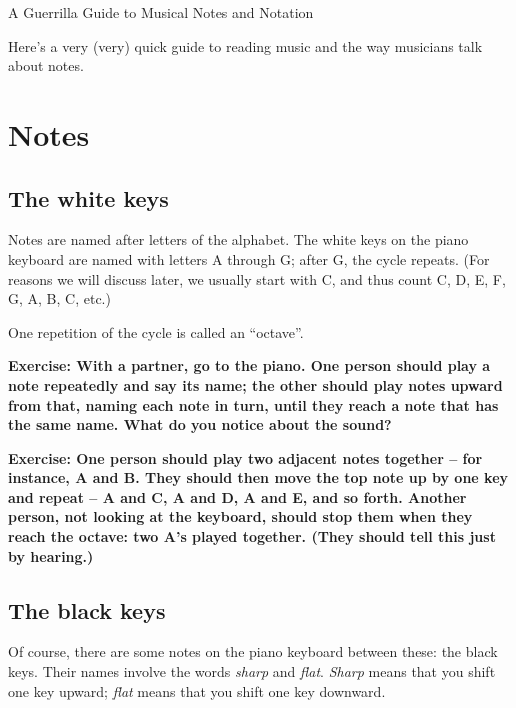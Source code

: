 \documentclass[10pt]{article}
\begin{document}
\begin{center}
{\Large A Guerrilla Guide to Musical Notes and Notation}
\end{center}

Here's a very (very) quick guide to reading music and the way musicians talk about notes.

\section {Notes}

\subsection{The white keys}

Notes are named after letters of the alphabet. The white keys on the piano keyboard are named with letters
A through G; after G, the cycle repeats. (For reasons we will discuss later, we usually start with C, and thus count
C, D, E, F, G, A, B, C, etc.)

One repetition of the cycle is called an ``octave''.



{\bf Exercise: With a partner, go to the piano. One person should play a note repeatedly and say its name; the other should 
play notes upward from that, naming each note in turn, until they reach a note that has the same name. What do you 
notice about the sound?}

\vspace{1in}

{\bf Exercise: One person should play two adjacent notes together -- for instance, A and B. They should then move the 
top note up by one key and repeat -- A and C, A and D, A and E, and so forth. Another person, not looking at the keyboard,
should stop them when they reach the octave: two A's played together. (They should tell this just by hearing.)}

\vspace{1in}


\subsection{The black keys}

Of course, there are some notes on the piano keyboard between these: the black keys. Their names involve the 
words {\it sharp} and {\it flat}. {\it Sharp} means that you shift one key upward; {\it flat} 
means that you shift one key downward.
\end{document}
